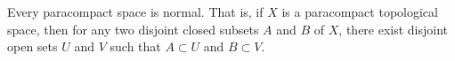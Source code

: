 Every paracompact space is normal. That is, if $X$ is a paracompact topological space, then for any two disjoint closed subsets $A$ and $B$ of $X$, there exist disjoint open sets $U$ and $V$ such that $A \subset U$ and $B \subset V$.
